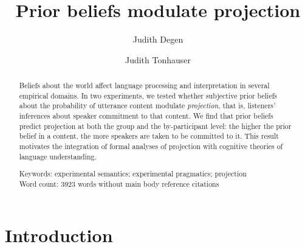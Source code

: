 \documentclass[11pt,fleqn]{article}
\title{Prior beliefs modulate projection}
\author[$\bullet$]{Judith Degen}
\author[$\circ$]{Judith Tonhauser}
\affil[$\bullet$]{Stanford University}
\affil[$\circ$]{The Ohio State University / University of Stuttgart}
\newcommand{\6}{\mbox{$[\hspace*{-.6mm}[$}}
\newcommand{\9}{\mbox{$]\hspace*{-.6mm}]$}}
\begin{document}

\maketitle

\begin{abstract}

Beliefs about the world affect language processing and interpretation in several empirical domains. In two experiments, we tested whether subjective prior beliefs about the probability of utterance content modulate \emph{projection}, that is, listeners' inferences about speaker commitment to that content. We find that prior beliefs predict projection at both the group and the by-participant level: the higher the prior belief in a content, the more speakers are taken to be committed to it. This result motivates the integration of formal analyses of projection with cognitive theories of language understanding.  

\vspace*{.25cm}
\noindent
Keywords: experimental semantics; experimental pragmatics; projection \\
Word count: 3923 words without main body reference citations

\end{abstract}


\section{Introduction}
\end{document}
